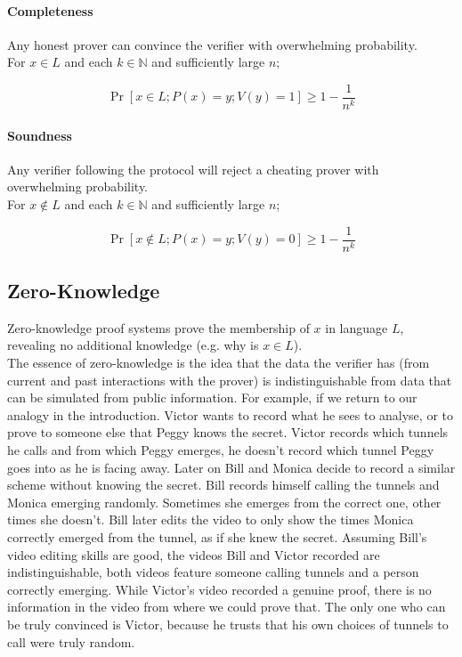 \paragraph{Completeness}

Any honest prover can convince the verifier with overwhelming probability.\\
For $x \in L$ and each $k \in \mathbb{N}$ and sufficiently large $n$;

$$\Pr[x \in L; P(x) = y; V(y) = 1] \ge 1 - \frac{1}{n^k}$$

\paragraph{Soundness}

Any verifier following the protocol will reject a cheating prover with overwhelming probability.\\
For $x \notin L$ and each $k \in \mathbb{N}$ and sufficiently large $n$;

$$\Pr[x \notin L; P(x) = y; V(y) = 0] \ge 1 - \frac{1}{n^k}$$

\subsection{Zero-Knowledge}

Zero-knowledge proof systems prove the membership of $x$ in language $L$, revealing no additional knowledge (e.g. why is $x \in L$).\\
The essence of zero-knowledge is the idea that the data the verifier has (from current and past interactions with the prover) is indistinguishable from data that can be simulated from public information.
For example, if we return to our analogy in the introduction. 
Victor wants to record what he sees to analyse, or to prove to someone else that Peggy knows the secret.
Victor records which tunnels he calls and from which Peggy emerges, he doesn't record which tunnel Peggy goes into as he is facing away.
Later on Bill and Monica decide to record a similar scheme without knowing the secret.
Bill records himself calling the tunnels and Monica emerging randomly. Sometimes she emerges from the correct one, other times she doesn't. 
Bill later edits the video to only show the times Monica correctly emerged from the tunnel, as if she knew the secret.
Assuming Bill's video editing skills are good, the videos Bill and Victor recorded are indistinguishable, both videos feature someone calling tunnels and a person correctly emerging. 
While Victor's video recorded a genuine proof, there is no information in the video from where we could prove that.
The only one who can be truly convinced is Victor, because he trusts that his own choices of tunnels to call were truly random.

